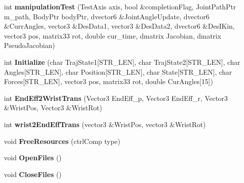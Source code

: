 \begin{DoxyCompactItemize}
\item 
\hypertarget{classAssemblyStrategy_a3df7bc77ca3f116e7329fbf1c54c0b3a}{int {\bfseries manipulation\-Test} (Test\-Axis axis, bool \&completion\-Flag, Joint\-Path\-Ptr m\-\_\-path, Body\-Ptr body\-Ptr, dvector6 \&Joint\-Angle\-Update, dvector6 \&Curr\-Angles, vector3 \&Des\-Data1, vector3 \&Des\-Data2, dvector6 \&Des\-I\-Kin, vector3 pos, matrix33 rot, double cur\-\_\-time, dmatrix Jacobian, dmatrix Pseudo\-Jacobian)}\label{classAssemblyStrategy_a3df7bc77ca3f116e7329fbf1c54c0b3a}

\item 
\hypertarget{classAssemblyStrategy_ae8fcf4e1ad20c0a1b69f650049d2f70d}{int {\bfseries Initialize} (char Traj\-State1\mbox{[}S\-T\-R\-\_\-\-L\-E\-N\mbox{]}, char Traj\-State2\mbox{[}S\-T\-R\-\_\-\-L\-E\-N\mbox{]}, char Angles\mbox{[}S\-T\-R\-\_\-\-L\-E\-N\mbox{]}, char Position\mbox{[}S\-T\-R\-\_\-\-L\-E\-N\mbox{]}, char State\mbox{[}S\-T\-R\-\_\-\-L\-E\-N\mbox{]}, char Forces\mbox{[}S\-T\-R\-\_\-\-L\-E\-N\mbox{]}, vector3 pos, matrix33 rot, double Cur\-Angles\mbox{[}15\mbox{]})}\label{classAssemblyStrategy_ae8fcf4e1ad20c0a1b69f650049d2f70d}

\item 
\hypertarget{classAssemblyStrategy_ac4ee085239f136606b30070383c22b65}{int {\bfseries End\-Eff2\-Wrist\-Trans} (Vector3 End\-Eff\-\_\-p, Vector3 End\-Eff\-\_\-r, Vector3 \&Wrist\-Pos, Vector3 \&Wrist\-Rot)}\label{classAssemblyStrategy_ac4ee085239f136606b30070383c22b65}

\item 
\hypertarget{classAssemblyStrategy_a9edccb051489ebb490c68489d8987e89}{int {\bfseries wrist2\-End\-Eff\-Trans} (vector3 \&Wrist\-Pos, vector3 \&Wrist\-Rot)}\label{classAssemblyStrategy_a9edccb051489ebb490c68489d8987e89}

\item 
\hypertarget{classAssemblyStrategy_ac7f889ea3c6191ac696db23644eae9c5}{void {\bfseries Free\-Resources} (ctrl\-Comp type)}\label{classAssemblyStrategy_ac7f889ea3c6191ac696db23644eae9c5}

\item 
\hypertarget{classAssemblyStrategy_a534a5e64dac6883d02a80b42818a4c8c}{void {\bfseries Open\-Files} ()}\label{classAssemblyStrategy_a534a5e64dac6883d02a80b42818a4c8c}

\item 
\hypertarget{classAssemblyStrategy_a7c9772295f1534a4b80b7fba22f010f7}{void {\bfseries Close\-Files} ()}\label{classAssemblyStrategy_a7c9772295f1534a4b80b7fba22f010f7}


\end{DoxyCompactItemize}
